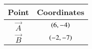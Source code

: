 \begin{tabular}{ |c| c|}
    \hline
    \textbf{Point}  & \textbf{Coordinates}\\
    \hline
    $\vec{A}$ & $\left(6,-4\right)$ \\
    \hline
    $\vec{B}$ & $\left(-2,-7\right)$\\
    \hline
\end{tabular}
